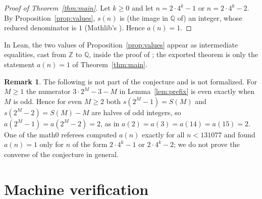 \documentclass[11pt]{amsart}
\theoremstyle{plain}
\theoremstyle{definition}
\newtheorem{remark}[theorem]{Remark}
\newcommand{\Q}{\mathbb{Q}}
\newcommand{\Z}{\mathbb{Z}}
\begin{document}
\begin{proof}[Proof of Theorem~\ref{thm:main}]
Let $k\ge0$ and let $n=2\cdot4^k-1$ or $n=2\cdot4^k-2$. By Proposition~\ref{prop:values}, $s(n)$ is (the image in $\Q$ of) an integer, whose reduced denominator is $1$ (Mathlib's ). Hence $a(n)=1$.
\end{proof}

In Lean, the two values of Proposition~\ref{prop:values} appear as intermediate equalities, cast from $\Z$ to $\Q$, inside the proof of ; the exported theorem is only the statement $a(n)=1$ of Theorem~\ref{thm:main}.

\begin{remark}\label{rem:converse}
The following is not part of the conjecture and is not formalized. For $M\ge1$ the numerator $3\cdot2^M-3-M$ in Lemma~\ref{lem:prefix} is even exactly when $M$ is odd. Hence for even $M\ge2$ both $s(2^M-1)=S(M)$ and $s(2^M-2)=S(M)-M$ are halves of odd integers, so $a(2^M-1)=a(2^M-2)=2$, as in $a(2)=a(3)=a(14)=a(15)=2$. One of the math0 referees computed $a(n)$ exactly for all $n<131077$ and found $a(n)=1$ only for $n$ of the form $2\cdot4^k-1$ or $2\cdot4^k-2$; we do not prove the converse of the conjecture in general.
\end{remark}

\section{Machine verification}\label{sec:lean}
\end{document}
